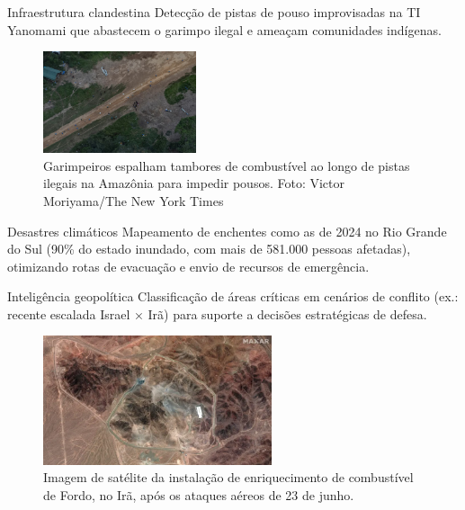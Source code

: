\begin{frame}{Infraestrutura clandestina}
  Detecção de pistas de pouso improvisadas na TI Yanomami que abastecem o garimpo ilegal e ameaçam comunidades indígenas.
 \begin{figure}
    \centering
    \includegraphics[width=0.4\textwidth]{introducao/foto_satelite_pista.png}
    \\
    \footnotesize Garimpeiros espalham tambores de combustível ao longo de pistas ilegais na Amazônia para impedir pousos. Foto: Victor Moriyama/The New York Times
  \end{figure}
  
\end{frame}

\begin{frame}{Desastres climáticos}
  Mapeamento de enchentes como as de 2024 no Rio Grande do Sul (90\% do estado inundado, com mais de 581.000 pessoas afetadas), otimizando rotas de evacuação e envio de recursos de emergência.
\end{frame}

\begin{frame}{Inteligência geopolítica}
  Classificação de áreas críticas em cenários de conflito (ex.: recente escalada Israel × Irã) para suporte a decisões estratégicas de defesa.

  \begin{figure}
    \centering
    \includegraphics[width=0.6\textwidth]{introducao/satelite_ira.png}
    \\
    \footnotesize Imagem de satélite da instalação de enriquecimento de combustível de Fordo, no Irã, após os ataques aéreos de 23 de junho.
  \end{figure}
  
\end{frame}
